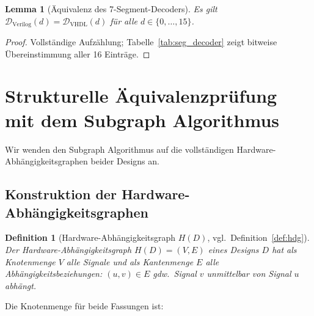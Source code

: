 ﻿\documentclass[12pt,a4paper]{report}
\newtheorem{definition}{Definition}[section]
\newtheorem{lemma}[theorem]{Lemma}
\begin{document}
\begin{lemma}[Äquivalenz des 7-Segment-Decoders]
	\label{lem:decoder_equiv}
	Es gilt $\mathcal{D}_\mathrm{Verilog}(d) = \mathcal{D}_\mathrm{VHDL}(d)$
	für alle $d \in \{0,\ldots,15\}$.
\end{lemma}

\begin{proof}
	Vollständige Aufzählung; Tabelle~\ref{tab:seg_decoder} zeigt bitweise
	Übereinstimmung aller 16 Einträge.
\end{proof}

\section{Strukturelle Äquivalenzprüfung mit dem Subgraph Algorithmus}
\label{subsec:strukturell_vv}

Wir wenden den Subgraph Algorithmus \cite{subgraph2026} auf die vollständigen
Hardware-Abhängigkeits\-graphen beider Designs an.

\subsection{Konstruktion der Hardware-Abhängigkeitsgraphen}

\begin{definition}[Hardware-Abhängigkeitsgraph $H(D)$, vgl.\ Definition~\ref{def:hdg}]
	Der Hard\-ware-Abhängigkeitsgraph $H(D) = (V, E)$ eines Designs $D$ hat als
	Knotenmenge $V$ alle Signale und als Kantenmenge $E$ alle
	Abhängigkeitsbeziehungen: $(u, v) \in E$ gdw.\ Signal $v$ unmittelbar von
	Signal $u$ abhängt.
\end{definition}

Die Knotenmenge für beide Fassungen ist:
\end{document}
